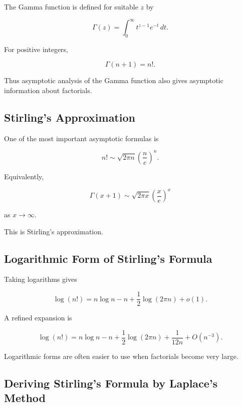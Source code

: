 The Gamma function is defined for suitable \(z\) by

\[
\boxed{
\Gamma(z)
=
\int_0^\infty
t^{z-1}e^{-t}\,dt.
}
\]

For positive integers,

\[
\boxed{
\Gamma(n+1)=n!.
}
\]

Thus asymptotic analysis of the Gamma function also gives asymptotic
information about factorials.

\subsection{Stirling's Approximation}
\label{subsec:stirlings-approximation}

One of the most important asymptotic formulas is

\[
\boxed{
n!
\sim
\sqrt{2\pi n}
\left(\frac{n}{e}\right)^n.
}
\]

Equivalently,

\[
\boxed{
\Gamma(x+1)
\sim
\sqrt{2\pi x}
\left(\frac{x}{e}\right)^x
}
\]

as \(x\to\infty\).

This is Stirling's approximation.

\subsection{Logarithmic Form of Stirling's Formula}
\label{subsec:log-stirling}

Taking logarithms gives

\[
\boxed{
\log(n!)
=
n\log n-n
+\frac12\log(2\pi n)
+
o(1).
}
\]

A refined expansion is

\[
\boxed{
\log(n!)
=
n\log n-n
+\frac12\log(2\pi n)
+\frac{1}{12n}
+O(n^{-3}).
}
\]

Logarithmic forms are often easier to use when factorials become very
large.

\subsection{Deriving Stirling's Formula by Laplace's Method}
\label{subsec:stirling-laplace}

